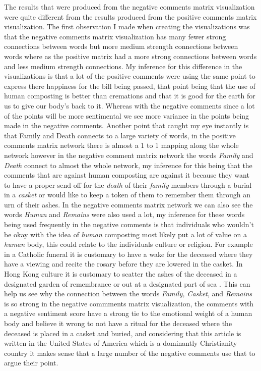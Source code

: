 \documentclass{article}
\begin{document}
The results that were produced from the negative comments matrix visualization were quite different from the results produced from the positive comments matrix visualization. The first observation I made when creating the visualizations was that the negative comments matrix visualization has many fewer strong connections between words but more medium strength connections between words where as the positive matrix had a more strong connections between words and less medium strength connections. My inference for this difference in the visualizations is that a lot of the positive comments were using the same point to express there happiness for the bill being passed, that point being that the use of human composting is better than cremations and that it is good for the earth for us to give our body's back to it. Whereas with the negative comments since a lot of the points will be more sentimental we see more variance in the points being made in the negative comments. Another point that caught my eye instantly is that Family and Death connects to a large variety of words, in the positive comments matrix network there is almost a 1 to 1 mapping along the whole network however in the negative comment matrix network the words \emph{Family} and \emph{Death} connect to almost the whole network, my inference for this being that the comments that are against human composting are against it because they want to have a proper send off for the \emph{death} of their \emph{family} members through a burial in a \emph{casket} or would like to keep a token of them to remember them through an urn of their ashes. In the negative comments matrix network we can also see the words \emph{Human} and \emph{Remains} were also used a lot, my inference for these words being used frequently in the negative comments is that individuals who wouldn't be okay with the idea of \emph{human} composting most likely put a lot of value on a \emph{human} body, this could relate to the individuals culture or religion. For example in a Catholic funeral it is customary to have a wake for the deceased where they have a viewing and recite the rosary before they are lowered in the casket. In Hong Kong culture it is customary to scatter the ashes of the deceased in a designated garden of remembrance or out at a designated part of sea \parencite[]{Norris_2019}. This can help us see why the connection between the words \emph{Family, Casket}, and \emph{Remains} is so strong in the negative commments matrix visualization, the comments with a negative sentiment score have a strong tie to the emotional weight of a human body and believe it wrong to not have a ritual for the deceased where the deceased is placed in a casket and buried, and considering that this article is written in the United States of America which is a dominantly Christianity country it makes sense that a large number of the negative comments use that to argue their point.
\end{document}
